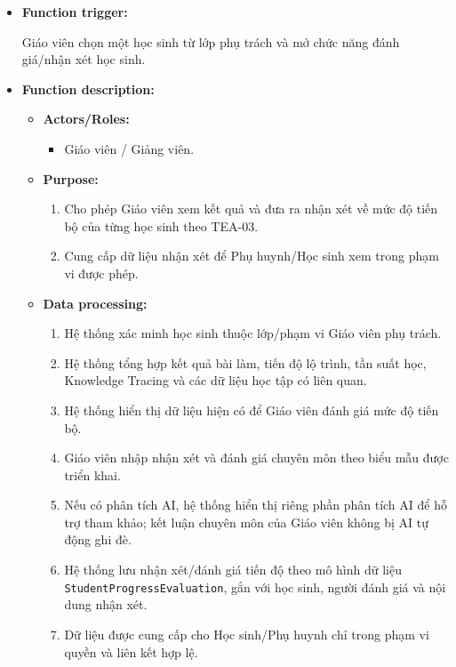 \documentclass[12pt,a4paper,oneside]{report}
\begin{document}
\begin{itemize}

    \item \textbf{Function trigger:}

    Giáo viên chọn một học sinh từ lớp phụ trách và mở chức năng đánh giá/nhận xét học sinh.

    \item \textbf{Function description:}

    \begin{itemize}

        \item \textbf{Actors/Roles:}
        \begin{itemize}
            \item Giáo viên / Giảng viên.
        \end{itemize}

        \item \textbf{Purpose:}
        \begin{enumerate}
            \item Cho phép Giáo viên xem kết quả và đưa ra nhận xét về mức độ tiến bộ của từng học sinh theo TEA-03.
            \item Cung cấp dữ liệu nhận xét để Phụ huynh/Học sinh xem trong phạm vi được phép.
        \end{enumerate}

        \item \textbf{Data processing:}
        \begin{enumerate}
            \item Hệ thống xác minh học sinh thuộc lớp/phạm vi Giáo viên phụ trách.
            \item Hệ thống tổng hợp kết quả bài làm, tiến độ lộ trình, tần suất học, Knowledge Tracing và các dữ liệu học tập có liên quan.
            \item Hệ thống hiển thị dữ liệu hiện có để Giáo viên đánh giá mức độ tiến bộ.
            \item Giáo viên nhập nhận xét và đánh giá chuyên môn theo biểu mẫu được triển khai.
            \item Nếu có phân tích AI, hệ thống hiển thị riêng phần phân tích AI để hỗ trợ tham khảo; kết luận chuyên môn của Giáo viên không bị AI tự động ghi đè.
            \item Hệ thống lưu nhận xét/đánh giá tiến độ theo mô hình dữ liệu \texttt{StudentProgressEvaluation}, gắn với học sinh, người đánh giá và nội dung nhận xét.
            \item Dữ liệu được cung cấp cho Học sinh/Phụ huynh chỉ trong phạm vi quyền và liên kết hợp lệ.
        \end{enumerate}


\end{itemize}
\end{itemize}
\end{document}
